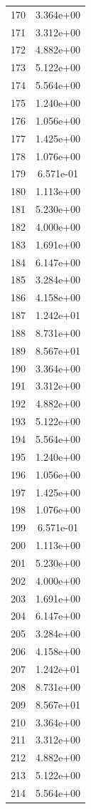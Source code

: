 \documentclass[12pt]{article}
\begin{document}
\begin{longtable}{@{}cc@{}}
170 & 3.364e+00 \\
171 & 3.312e+00 \\
172 & 4.882e+00 \\
173 & 5.122e+00 \\
174 & 5.564e+00 \\
175 & 1.240e+00 \\
176 & 1.056e+00 \\
177 & 1.425e+00 \\
178 & 1.076e+00 \\
179 & 6.571e-01 \\
180 & 1.113e+00 \\
181 & 5.230e+00 \\
182 & 4.000e+00 \\
183 & 1.691e+00 \\
184 & 6.147e+00 \\
185 & 3.284e+00 \\
186 & 4.158e+00 \\
187 & 1.242e+01 \\
188 & 8.731e+00 \\
189 & 8.567e+01 \\
190 & 3.364e+00 \\
191 & 3.312e+00 \\
192 & 4.882e+00 \\
193 & 5.122e+00 \\
194 & 5.564e+00 \\
195 & 1.240e+00 \\
196 & 1.056e+00 \\
197 & 1.425e+00 \\
198 & 1.076e+00 \\
199 & 6.571e-01 \\
200 & 1.113e+00 \\
201 & 5.230e+00 \\
202 & 4.000e+00 \\
203 & 1.691e+00 \\
204 & 6.147e+00 \\
205 & 3.284e+00 \\
206 & 4.158e+00 \\
207 & 1.242e+01 \\
208 & 8.731e+00 \\
209 & 8.567e+01 \\
210 & 3.364e+00 \\
211 & 3.312e+00 \\
212 & 4.882e+00 \\
213 & 5.122e+00 \\
214 & 5.564e+00 \\

\end{longtable}
\end{document}
